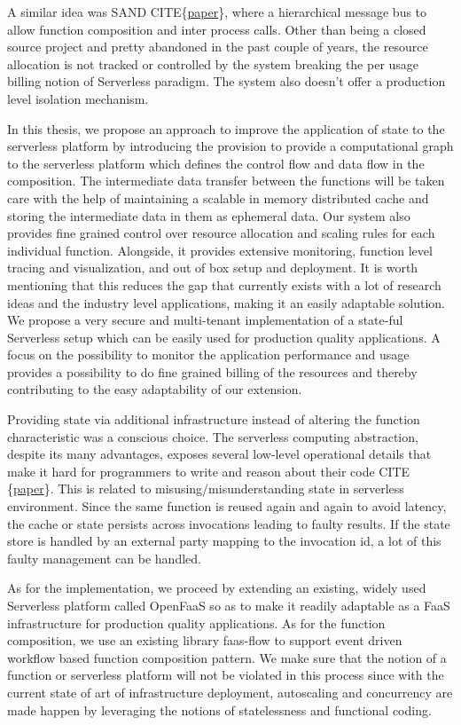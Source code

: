 \documentclass[12pt,titlepage]{article}
\begin{document}
A similar idea was SAND CITE\{\href{https://www.usenix.org/system/files/conference/atc18/atc18-akkus.pdf}{paper}\}, where a hierarchical message bus to allow
function composition and inter process calls. Other than being a closed source
project and pretty abandoned in the past couple of years, the resource
allocation is not tracked or controlled by the system breaking the per usage
billing notion of Serverless paradigm. The system also doesn't offer a
production level isolation mechanism.

In this thesis, we propose an approach to improve the application of state
to the serverless platform by introducing the provision to provide a
computational graph to the serverless platform which defines the control flow
and data flow in the composition. The intermediate data transfer between the
functions will be taken care with the help of maintaining a scalable in memory
distributed cache and storing the intermediate data in them as ephemeral data.
Our system also provides fine grained control over resource allocation and
scaling rules for each individual function. Alongside, it provides extensive
monitoring, function level tracing and visualization, and out of box setup and
deployment. It is worth mentioning  that this  reduces the gap that currently
exists with a lot of research ideas and the industry level applications, making
it an easily adaptable solution. We propose a very secure and multi-tenant implementation of a
state-ful Serverless setup which can be easily used for production quality
applications. A focus on the possibility to monitor the application performance
and usage provides a possibility to do fine grained billing of the resources and thereby
contributing to the easy adaptability of our extension.

Providing state via additional infrastructure instead of altering the function
characteristic was a conscious choice. The serverless computing abstraction,
despite its many advantages, exposes several low-level operational  details that
make it hard for programmers to write and reason about their code CITE \{\href{https://arxiv.org/pdf/1902.05870.pdf}{paper}\}. This is
related to misusing/misunderstanding state in serverless environment. Since
the same function is reused again and again to avoid latency, the cache or state
persists across invocations leading to faulty results. If the state store is
handled by an external party mapping to the invocation id, a lot of this faulty
management can be handled.

As for the implementation, we proceed by extending an existing, widely used
Serverless platform called OpenFaaS so as to make it readily adaptable as a FaaS
infrastructure for production quality applications. As for the function
composition, we use an existing library faas-flow to support event driven
workflow based function composition pattern. We make sure that the notion of a
function or serverless platform will not be violated in this process since with
the current state of art of infrastructure deployment, autoscaling and
concurrency are made happen by leveraging the notions of statelessness and functional coding.
\end{document}
